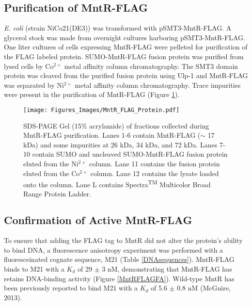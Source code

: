 \documentclass[12pt,twoside]{reedthesis}
\begin{document}
        	\clearpage
     
     \subsection{Purification of MntR-FLAG}
     
     \textit{E. coli} (strain NiCo21(DE3)) was transformed with pSMT3-MntR-FLAG. A glycerol stock was made from overnight cultures harboring pSMT3-MntR-FLAG. One liter cultures of cells expressing MntR-FLAG were pelleted for purification of the FLAG labeled protein. SUMO-MntR-FLAG fusion protein was purified from lysed cells by Co$^{2+}$ metal affinity column chromatography. The SMT3 domain protein was cleaved from the purified fusion protein using Ulp-1 and MntR-FLAG was separated by Ni$^{2+}$ metal affinity column chromatography. Trace impurities were present in the purification of MntR-FLAG (Figure \ref{PurificationMntRFLAG}). 
        	\begin{figure}[h!tbp]
        		\centering
        		\texttt{[image: Figures\_Images/MntR\_FLAG\_Protein.pdf]}
        		\caption[MntR-FLAG Purification]{SDS-PAGE Gel (15\% acrylamide) of fractions collected during MntR-FLAG purification. Lanes 1-6 contain MntR-FLAG ($\sim$ 17 kDa) and some impurities at 26 kDa, 34 kDa, and 72 kDa. Lanes 7-10 contain SUMO and uncleaved SUMO-MntR-FLAG fusion protein eluted from the Ni$^{2+}$ column. Lane 11 contains the fusion protein eluted from the Co$^{2+}$ column. Lane 12 contains the lysate loaded onto the column. Lane L contains Spectra\textsuperscript{TM} Multicolor Broad Range Protein Ladder.}
        		\label{PurificationMntRFLAG}
        	\end{figure}
        	
        	\clearpage
     
      \subsection{Confirmation of Active MntR-FLAG}
      
      To ensure that adding the FLAG tag to MntR did not alter the protein's ability to bind DNA, a fluorescence anisotropy experiment was performed with a fluoresceinated cognate sequence, M21 (Table \ref{DNAsequences}). MntR-FLAG binds to M21 with a $K_{d}$ of 29 $\pm$ 3 nM, demonstrating that MntR-FLAG has retains DNA-binding activity (Figure \ref{MntRFLAGFA}). Wild-type MntR has been previously reported to bind M21 with a $K_{d}$ of 5.6 $\pm$ 0.8 nM (McGuire, 2013). 
 
\end{document}
